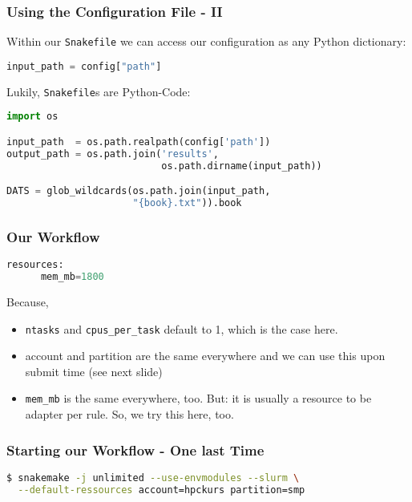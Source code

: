 \begin{frame}[fragile]
  \frametitle{Using the Configuration File - II}
  Within our \texttt{Snakefile} we can access our configuration as any Python dictionary:
  \begin{lstlisting}[language=Python,style=Python]
input_path = config["path"]
  \end{lstlisting}
  \pause
  Lukily, \texttt{Snakefile}s are Python-Code:
  \begin{lstlisting}[language=Python,style=Python]
import os

input_path  = os.path.realpath(config['path'])
output_path = os.path.join('results', 
                           os.path.dirname(input_path))

DATS = glob_wildcards(os.path.join(input_path, 
                      "{book}.txt")).book
  \end{lstlisting}
  
\end{frame}

\begin{frame}[fragile]
  \frametitle{Our Workflow}
  \begin{lstlisting}[language=Python,style=Python]
   resources:
      mem_mb=1800
  \end{lstlisting}
  \pause
  Because,
  \begin{itemize}
   \item \texttt{ntasks} and \texttt{cpus\_per\_task} default to 1, which is the case here.
   \item account and partition are the same everywhere and we can use this upon submit time (see next slide)
   \item \texttt{mem\_mb} is the same everywhere, too. But: it is usually a resource to be adapter per rule. So, we try this here, too.
  \end{itemize}
\end{frame}

\begin{frame}[fragile]
  \frametitle{Starting our Workflow - One last Time}
  \begin{lstlisting}[language=Bash,style=Shell]
$ snakemake -j unlimited --use-envmodules --slurm \
  --default-ressources account=hpckurs partition=smp
  \end{lstlisting}
\end{frame}

